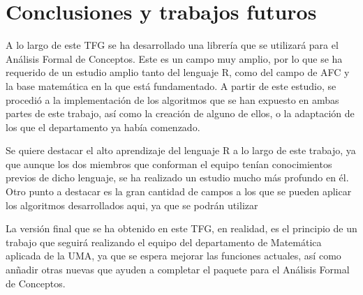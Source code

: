 \section{Conclusiones y trabajos futuros}

A lo largo de este TFG se ha desarrollado una librer\'ia que se utilizar\'a para el An\'alisis Formal de Conceptos. Este es un 
campo muy amplio, por lo que se ha requerido de un estudio amplio tanto del lenguaje R, como del campo de AFC y la base matem\'atica en la que 
est\'a fundamentado. A partir de este estudio, se procedi\'o a la implementaci\'on de los algoritmos que se han expuesto en ambas partes de 
este trabajo, as\'i como la creaci\'on de alguno de ellos, o la adaptaci\'on de los que el departamento ya hab\'ia comenzado.

Se quiere destacar el alto aprendizaje del lenguaje R a lo largo de este trabajo, ya que aunque los dos miembros que conforman el equipo ten\'ian 
conocimientos previos de dicho lenguaje, se ha realizado un estudio mucho m\'as profundo en \'el.
Otro punto a destacar es la gran cantidad de campos a los que se pueden aplicar los algoritmos desarrollados aqui, ya que se podr\'an 
utilizar 

La versi\'on final que se ha obtenido en este TFG, en realidad, es el principio de un trabajo que seguir\'a realizando el equipo del 
departamento de Matem\'atica aplicada de la UMA, ya que se espera mejorar las funciones actuales, as\'i como an\~nadir otras nuevas 
que ayuden a completar el paquete para el An\'alisis Formal de Conceptos.